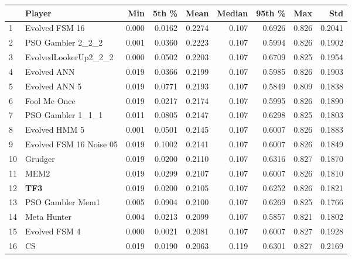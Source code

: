 \begin{tabular}{llrrrrrrr}
\toprule
{} &                   Player &    Min &   5th \% &    Mean &  Median &  95th \% &    Max &     Std \\
\midrule
1  &           Evolved FSM 16 &  0.000 &  0.0162 &  0.2274 &   0.107 &  0.6926 &  0.826 &  0.2041 \\
2  &        PSO Gambler 2\_2\_2 &  0.001 &  0.0360 &  0.2223 &   0.107 &  0.5994 &  0.826 &  0.1902 \\
3  &     EvolvedLookerUp2\_2\_2 &  0.000 &  0.0502 &  0.2203 &   0.107 &  0.6709 &  0.825 &  0.1954 \\
4  &              Evolved ANN &  0.019 &  0.0366 &  0.2199 &   0.107 &  0.5985 &  0.826 &  0.1903 \\
5  &            Evolved ANN 5 &  0.019 &  0.0771 &  0.2193 &   0.107 &  0.5849 &  0.809 &  0.1838 \\
6  &             Fool Me Once &  0.019 &  0.0217 &  0.2174 &   0.107 &  0.5995 &  0.826 &  0.1890 \\
7  &        PSO Gambler 1\_1\_1 &  0.011 &  0.0805 &  0.2147 &   0.107 &  0.6298 &  0.825 &  0.1803 \\
8  &            Evolved HMM 5 &  0.001 &  0.0501 &  0.2145 &   0.107 &  0.6007 &  0.826 &  0.1883 \\
9  &  Evolved FSM 16 Noise 05 &  0.019 &  0.1002 &  0.2141 &   0.107 &  0.6007 &  0.826 &  0.1849 \\
10 &                  Grudger &  0.019 &  0.0200 &  0.2110 &   0.107 &  0.6316 &  0.827 &  0.1870 \\
11 &                     MEM2 &  0.019 &  0.0299 &  0.2107 &   0.107 &  0.6007 &  0.826 &  0.1810 \\
12 &                      \textbf{TF3} &  0.019 &  0.0200 &  0.2105 &   0.107 &  0.6252 &  0.826 &  0.1821 \\
13 &         PSO Gambler Mem1 &  0.005 &  0.0904 &  0.2100 &   0.107 &  0.6269 &  0.825 &  0.1766 \\
14 &              Meta Hunter &  0.004 &  0.0213 &  0.2099 &   0.107 &  0.5857 &  0.821 &  0.1802 \\
15 &            Evolved FSM 4 &  0.000 &  0.0021 &  0.2081 &   0.107 &  0.6007 &  0.827 &  0.1928 \\
16 &                       CS &  0.019 &  0.0190 &  0.2063 &   0.119 &  0.6301 &  0.827 &  0.2169 \\
\bottomrule
\end{tabular}
